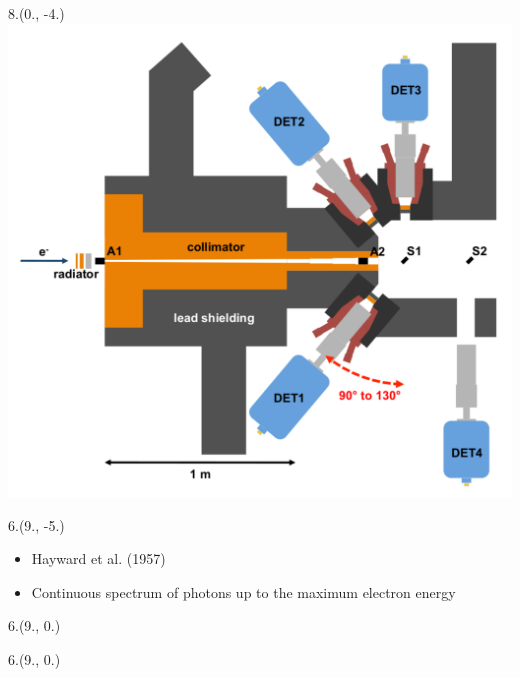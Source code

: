 \begin{textblock}{8.}(0., -4.)
    \includegraphics[width=\textwidth]{figures/dhips.pdf}
\end{textblock}

\begin{textblock}{6.}(9., -5.)
    \begin{itemize}
        \item Hayward et al. (1957)
        \item Continuous spectrum of photons up to the maximum electron energy
    \end{itemize}
\end{textblock}

\def \SPECTRUMX {9.}
\def \SPECTRUMY {0.}

\begin{textblock}{6.}(\SPECTRUMX, \SPECTRUMY)
\end{textblock}

\begin{textblock}{6.}(\SPECTRUMX, \SPECTRUMY)
\end{textblock}